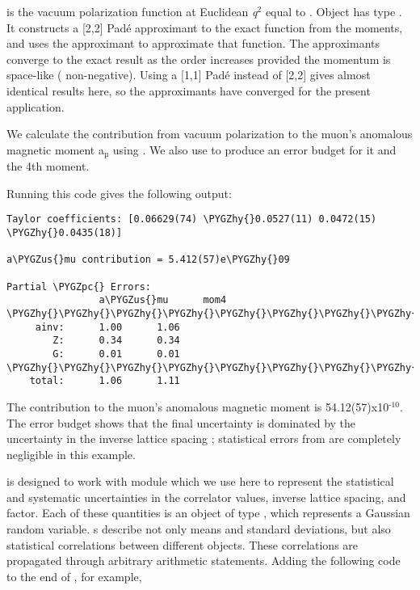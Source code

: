 \documentclass[letterpaper,10pt,english]{sphinxmanual}
\def\PYGZus{\char`\_}
\def\PYGZpc{\char`\%}
\def\PYGZhy{\char`\-}
\begin{document}
 is the vacuum polarization function at Euclidean \emph{q}$^{\text{2}}$
equal to . Object  has type {\hyperref[g2tools:g2tools.vacpol]{\emph{}}}. It
constructs a  {[}2,2{]} Padé approximant to the exact function from the moments,
and uses the approximant to  approximate that function.
The approximants converge to the exact result as the order
increases provided the momentum is space-like ( non-negative).
Using a {[}1,1{]} Padé instead of {[}2,2{]} gives almost identical results here, so the
approximants have converged for the present application.

We calculate the contribution from vacuum polarization 
to the muon's anomalous magnetic moment a$_{\text{µ}}$ using
. We also use 
to produce an error budget for it and the 4th moment.

Running this code gives the following output:

\begin{Verbatim}[commandchars=\\\{\}]
Taylor coefficients: [0.06629(74) \PYGZhy{}0.0527(11) 0.0472(15) \PYGZhy{}0.0435(18)]

a\PYGZus{}mu contribution = 5.412(57)e\PYGZhy{}09

Partial \PYGZpc{} Errors:
                a\PYGZus{}mu      mom4
\PYGZhy{}\PYGZhy{}\PYGZhy{}\PYGZhy{}\PYGZhy{}\PYGZhy{}\PYGZhy{}\PYGZhy{}\PYGZhy{}\PYGZhy{}\PYGZhy{}\PYGZhy{}\PYGZhy{}\PYGZhy{}\PYGZhy{}\PYGZhy{}\PYGZhy{}\PYGZhy{}\PYGZhy{}\PYGZhy{}\PYGZhy{}\PYGZhy{}\PYGZhy{}\PYGZhy{}\PYGZhy{}\PYGZhy{}\PYGZhy{}\PYGZhy{}\PYGZhy{}\PYGZhy{}
     ainv:      1.00      1.06
        Z:      0.34      0.34
        G:      0.01      0.01
\PYGZhy{}\PYGZhy{}\PYGZhy{}\PYGZhy{}\PYGZhy{}\PYGZhy{}\PYGZhy{}\PYGZhy{}\PYGZhy{}\PYGZhy{}\PYGZhy{}\PYGZhy{}\PYGZhy{}\PYGZhy{}\PYGZhy{}\PYGZhy{}\PYGZhy{}\PYGZhy{}\PYGZhy{}\PYGZhy{}\PYGZhy{}\PYGZhy{}\PYGZhy{}\PYGZhy{}\PYGZhy{}\PYGZhy{}\PYGZhy{}\PYGZhy{}\PYGZhy{}\PYGZhy{}
    total:      1.06      1.11
\end{Verbatim}

The contribution to the muon's anomalous magnetic moment is
54.12(57)x10$^{\text{-10}}$. The error budget shows that the final
uncertainty is dominated by the uncertainty in the inverse
lattice spacing ; statistical errors from  are
completely negligible in this example.

{\hyperref[g2tools:module-g2tools]{\emph{}}} is designed to work with module  which we use here
to represent the statistical and systematic uncertainties in
the correlator values, inverse lattice spacing, and  factor. Each of these
quantities is an object of type , which represents
a Gaussian random variable. s describe not only
means and standard deviations, but also statistical correlations between
different objects. These correlations are propagated through arbitrary
arithmetic statements. Adding the following code to the end of ,
for example,
\end{document}
